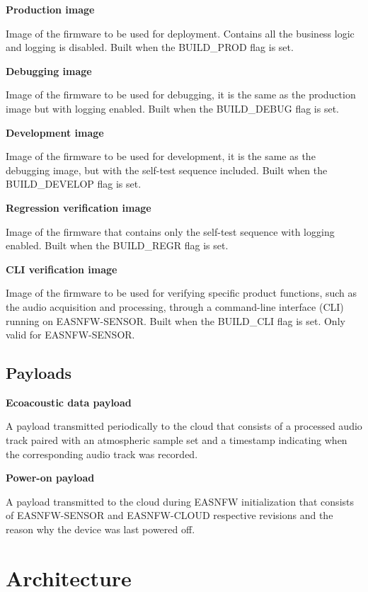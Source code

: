 \documentclass[11pt,a4paper]{article}
\begin{document}
\textbf{Production image}

Image of the firmware to be used for deployment. Contains all the business
logic and logging is disabled. Built when the BUILD\_PROD flag is set.

\textbf{Debugging image}

Image of the firmware to be used for debugging, it is the same as the
production image but with logging enabled. Built when the BUILD\_DEBUG flag is
set.

\textbf{Development image}

Image of the firmware to be used for development, it is the same as the
debugging image, but with the self-test sequence included. Built when the
BUILD\_DEVELOP flag is set.

\textbf{Regression verification image}

Image of the firmware that contains only the self-test sequence with logging
enabled. Built when the BUILD\_REGR flag is set.

\textbf{CLI verification image}

Image of the firmware to be used for verifying specific product functions, such
as the audio acquisition and processing, through a command-line interface (CLI)
running on EASNFW-SENSOR. Built when the BUILD\_CLI flag is set. Only valid for
EASNFW-SENSOR.

\subsection{Payloads}

\textbf{Ecoacoustic data payload}

A payload transmitted periodically to the cloud that consists of a processed
audio track paired with an atmospheric sample set and a timestamp indicating
when the corresponding audio track was recorded.

\textbf{Power-on payload}

A payload transmitted to the cloud during EASNFW initialization that consists
of EASNFW-SENSOR and EASNFW-CLOUD respective revisions and the reason why the
device was last powered off.

\section{Architecture}
\label{sec:architecture}
\end{document}
